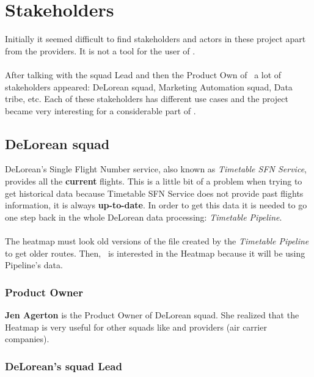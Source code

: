 
\chapter{Stakeholders}

\label{chapter04}

Initially it seemed difficult to find stakeholders and actors in these project apart from the providers. It is not a tool for the user of \company.
\\\\
After talking with the squad Lead and then the Product Own of \squad\ a lot of stakeholders appeared: DeLorean squad, Marketing Automation squad, Data tribe, etc. Each of these stakeholders has different use cases and the project became very interesting for a considerable part of \company.

\section{DeLorean squad} \label{dlr}

DeLorean's Single Flight Number service, also known as \textit{Timetable SFN Service}, provides all the \textbf{current} flights. This is a little bit of a problem when trying to get historical data because Timetable SFN Service does not provide past flights information, it is always \textbf{up-to-date}. In order to get this data it is needed to go one step back in the whole DeLorean data processing: \textit{Timetable Pipeline}.
\\\\
The heatmap must look old versions of the file created by the \textit{Timetable Pipeline} to get older routes. Then, \squad\ is interested in the Heatmap because it will be using Pipeline's data.

\subsection*{Product Owner} \label{product_owner}

\textbf{Jen Agerton} is the Product Owner of DeLorean squad. She realized that the Heatmap is very useful for other squads like  and providers (air carrier companies).

\subsection*{DeLorean's squad Lead}

